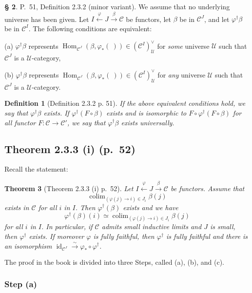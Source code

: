 \documentclass[12pt]{article}%
\newtheorem{thm}{Theorem}%
\newtheorem{df}[thm]{Definition}%
\theoremstyle{remark}
\theoremstyle{definition}
\newtheorem{s}[thm]{\S}%
\newcommand{\nn}{\noindent}
\newcommand{\C}{\mathcal C}
\newcommand{\U}{\mathcal U}
\newcommand{\pp}{\varphi}
\newcommand{\xr}{\xrightarrow}
\DeclareMathOperator*{\colim}{colim}%
\DeclareMathOperator{\id}{id}
\DeclareMathOperator{\Hom}{Hom}%
\begin{document}
%

\begin{s} 
P.~51, Definition 2.3.2 (minor variant). We assume that no underlying universe has been given. Let $I\xleftarrow\pp J\xr\beta\C$ be functors, let $\beta$ be in $\C^J$, and let $\pp^\dagger\beta$ be in $\C^I$. The following conditions are equivalent:

\nn(a) $\pp^\dagger\beta$ represents $\Hom_{\C^J}(\beta,\pp_*(\ ))\in(\C^I)^\vee_\U$ for \emph{some} universe $\U$ such that $\C^J$ is a $\U$-category,

\nn(b) $\pp^\dagger\beta$ represents $\Hom_{\C^J}(\beta,\pp_*(\ ))\in(\C^I)^\vee_\U$ for \emph{any} universe $\U$ such that $\C^J$ is a $\U$-category. 

\begin{df}[Definition 2.3.2 p. 51]\label{232}
If the above equivalent conditions hold, we say that $\pp^\dagger\beta$ {\em exists}. If $\pp^\dagger(F\circ\beta)$ exists and is isomorphic to $F\circ\pp^\dagger(F\circ\beta)$ for all functor $F:\C\to\C'$, we say that $\pp^\dagger\beta$ exists {\em universally}.
\end{df}
\end{s}


\subsection{Theorem 2.3.3 (i) (p.~52)}

Recall the statement: 

\begin{thm}[Theorem 2.3.3 (i) p.~52]\label{233i}
Let $I\xleftarrow\pp J\xr\beta\C$ be functors. Assume that 
$$
\colim_{(\pp(j)\to i)\in J_i}\beta(j)
$$ 
exists in $\C$ for all $i$ in $I$. Then $\pp^\dagger(\beta)$ exists and we have 
%
\begin{equation}\label{236}
\pp^\dagger(\beta)(i)\simeq\colim_{(\pp(j)\to i)\in J_i}\beta(j)
\end{equation} 
%
for all $i$ in $I$. In particular, if $\C$ admits small inductive limits and $J$ is small, then 
$\pp^\dagger$ exists. If moreover $\pp$ is fully faithful, then $\pp^\dagger$ is fully faithful and there is an isomorphism $\id_{\C^J}\xr\sim\pp_*\circ\pp^\dagger$. 
\end{thm}
The proof in the book is divided into three Steps, called (a), (b), and (c). 

%

\subsubsection{Step (a)}\label{scji}
\end{document}
